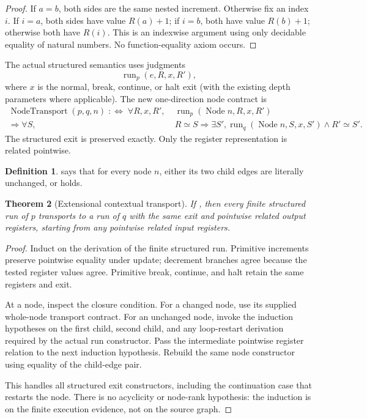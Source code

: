 \documentclass[11pt,letterpaper]{article}
\newtheorem{theorem}{Theorem}[section]
\theoremstyle{definition}
\newtheorem{definition}[theorem]{Definition}
\newcommand{\code}[1]{\texttt{\detokenize{#1}}}
\newcommand{\RegEq}{\mathrel{\simeq}}
\begin{document}
\begin{proof}
If $a=b$, both sides are the same nested increment. Otherwise fix an index
$i$. If $i=a$, both sides have value $R(a)+1$; if $i=b$, both have value
$R(b)+1$; otherwise both have $R(i)$. This is an indexwise argument using only
decidable equality of natural numbers. No function-equality axiom occurs.
\end{proof}

The actual structured semantics uses judgments
\[
 \operatorname{run}_p(e,R,x,R'),
\]
where $x$ is the normal, break, continue, or halt exit (with the existing
depth parameters where applicable). The new one-direction node contract is
\[
\begin{split}
 \operatorname{NodeTransport}(p,q,n)\;:\Longleftrightarrow\;
 \forall R,x,R',\;&\operatorname{run}_p(\operatorname{Node}n,R,x,R')\\
 \Longrightarrow\forall S,\;&R\RegEq S\Longrightarrow
 \exists S',\operatorname{run}_q(\operatorname{Node}n,S,x,S')\wedge R'\RegEq S'.
\end{split}
\]
The structured exit is preserved exactly. Only the register representation is
related pointwise.

\begin{definition}
\code{ClosedExt p q} says that for every node $n$, either its two child edges
are literally unchanged, or \code{NodeTransport p q n} holds.
\end{definition}

\begin{theorem}[Extensional contextual transport]
\label{thm:transport}
If \code{ClosedExt p q}, then every finite structured run of $p$ transports
to a run of $q$ with the same exit and pointwise related output registers,
starting from any pointwise related input registers.
\end{theorem}

\begin{proof}
Induct on the derivation of the finite structured run. Primitive increments
preserve pointwise equality under update; decrement branches agree because
the tested register values agree. Primitive break, continue, and halt retain
the same registers and exit.

At a node, inspect the closure condition. For a changed node, use its supplied
whole-node transport contract. For an unchanged node, invoke the induction
hypotheses on the first child, second child, and any loop-restart derivation
required by the actual run constructor. Pass the intermediate pointwise
register relation to the next induction hypothesis. Rebuild the same node
constructor using equality of the child-edge pair.

This handles all structured exit constructors, including the continuation
case that restarts the node. There is no acyclicity or node-rank hypothesis:
the induction is on the finite execution evidence, not on the source graph.
\end{proof}
\end{document}
